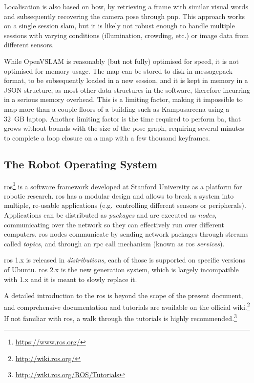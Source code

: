 \documentclass[11pt, letterpaper, twoside]{article}
\begin{document}
Localisation is also based on \gls{bow}, by retrieving a frame with similar
visual words and subsequently recovering the camera pose through \gls{pnp}.
This approach works on a single session \gls{slam}, but it is likely not robust
enough to handle multiple sessions with varying conditions (illumination,
crowding, etc.) or image data from different sensors.

While OpenVSLAM is reasonably (but not fully) optimised for speed, it is not
optimised for memory usage. The map can be stored to disk in messagepack
format, to be subsequently loaded in a new session, and it is kept in memory in
a JSON structure, as most other data structures in the software, therefore
incurring in a serious memory overhead. This is a limiting factor, making it
impossible to map more than a couple floors of a building such as Kampusareena
using a 32~GB laptop. Another limiting factor is the time required to perform
\gls{ba}, that grows without bounds with the size of the pose graph, requiring
several minutes to complete a loop closure on a map with a few thousand
keyframes.

\subsection{The Robot Operating System}

\gls{ros}\footnote{\url{https://www.ros.org/}} is a software framework
developed at Stanford University as a platform for robotic research. \gls{ros}
has a modular design and allows to break a system into multiple, re-usable
applications (e.g.\ controlling different sensors or peripherals). Applications
can be distributed as \textit{packages} and are executed as \textit{nodes},
communicating over the network so they can effectively run over different
computers. \gls{ros} nodes communicate by sending network packages through
streams called \textit{topics}, and through an \gls{rpc} call mechanism (known
as \gls{ros} \textit{services}).

\gls{ros} 1.x is released in \textit{distributions}, each of those is supported
on specific versions of Ubuntu. \gls{ros} 2.x is the new generation system,
which is largely incompatible with 1.x and it is meant to slowly replace it.

A detailed introduction to the \gls{ros} is beyond the scope of the present
document, and comprehensive documentation and tutorials are available on the
official wiki.\footnote{\url{http://wiki.ros.org/}} If not familiar with
\gls{ros}, a walk through the tutorials is highly
recommended.\footnote{\url{http://wiki.ros.org/ROS/Tutorials}}


\end{document}
